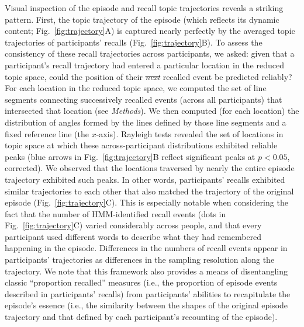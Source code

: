 \documentclass[10pt]{article}
\renewcommand{\includegraphics}[2][]{} %
\newcommand{\arrows}{7} %
\providecommand{\DIFaddtex}[1]{{\protect\color{blue}\uwave{#1}}} %
\providecommand{\DIFdeltex}[1]{{\protect\color{red}\sout{#1}}}                      %
\providecommand{\DIFaddbegin}{} %
\providecommand{\DIFaddend}{} %
\providecommand{\DIFdelbegin}{} %
\providecommand{\DIFdelend}{} %
\providecommand{\DIFadd}[1]{\texorpdfstring{\DIFaddtex{#1}}{#1}} %
\providecommand{\DIFdel}[1]{\texorpdfstring{\DIFdeltex{#1}}{}} %
\newcommand{\DIFscaledelfig}{0.5}
\newlength{\DIFdelgraphicswidth} %
\newlength{\DIFdelgraphicsheight} %
\newcommand{\DIFaddincludegraphics}[2][]{{\color{blue}\fbox{\DIFOincludegraphics[#1]{#2}}}} %
\newcommand{\DIFdelincludegraphics}[2][]{%
\sbox{\DIFdelgraphicsbox}{\DIFOincludegraphics[#1]{#2}}%
\settoboxwidth{\DIFdelgraphicswidth}{\DIFdelgraphicsbox} %
\settoboxtotalheight{\DIFdelgraphicsheight}{\DIFdelgraphicsbox} %
\scalebox{\DIFscaledelfig}{%
\parbox[b]{\DIFdelgraphicswidth}{\usebox{\DIFdelgraphicsbox}\\[-\baselineskip] \rule{\DIFdelgraphicswidth}{0em}}\llap{\resizebox{\DIFdelgraphicswidth}{\DIFdelgraphicsheight}{%
\setlength{\unitlength}{\DIFdelgraphicswidth}%
\begin{picture}(1,1)%
\thicklines\linethickness{2pt} %
{\color[rgb]{1,0,0}\put(0,0){\framebox(1,1){}}}%
{\color[rgb]{1,0,0}\put(0,0){\line( 1,1){1}}}%
{\color[rgb]{1,0,0}\put(0,1){\line(1,-1){1}}}%
\end{picture}%
}\hspace*{3pt}}} %
} %
\DeclareRobustCommand{\DIFaddbegin}{\DIFOaddbegin \let\includegraphics\DIFaddincludegraphics} %
\DeclareRobustCommand{\DIFaddend}{\DIFOaddend \let\includegraphics\DIFOincludegraphics} %
\DeclareRobustCommand{\DIFdelbegin}{\DIFOdelbegin \let\includegraphics\DIFdelincludegraphics} %
\DeclareRobustCommand{\DIFdelend}{\DIFOaddend \let\includegraphics\DIFOincludegraphics} %
\begin{document}
Visual inspection of the episode and recall topic trajectories reveals a striking pattern.  First, the topic trajectory of the episode (which reflects its dynamic content; Fig.~\ref{fig:trajectory}A) is captured nearly perfectly by the averaged topic trajectories of participants' recalls (Fig.~\ref{fig:trajectory}B).  To assess the consistency of these recall trajectories across participants, we asked: given that a participant's recall trajectory had entered a particular location in the reduced topic space, could the position of their \DIFdelbegin \textit{\DIFdel{next}} %
\DIFdelend \DIFaddbegin \DIFadd{next }\DIFaddend recalled event be predicted reliably?  For each location in the reduced topic space, we computed the set of line segments connecting successively recalled events (across all participants) that intersected that location (see \textit{Methods}\DIFaddbegin \DIFadd{, Supp.\ Fig.~\arrows}\DIFaddend ).  We then computed (for each location) the distribution of angles formed by the lines defined by those line segments and a fixed reference line (the $x$-axis).  Rayleigh tests revealed the set of locations in topic space at which these across-participant distributions exhibited reliable peaks (blue arrows in Fig.~\ref{fig:trajectory}B reflect significant peaks at $p < 0.05$, corrected).  We observed that the locations traversed by nearly the entire episode trajectory exhibited such peaks.  In other words, participants' recalls exhibited similar trajectories to each other that also matched the trajectory of the original episode (Fig.~\ref{fig:trajectory}C).  This is especially notable when considering the fact that the number of HMM-identified recall events (dots in Fig.~\ref{fig:trajectory}C) varied considerably across people, and that every participant used different words to describe what they had remembered happening in the episode.  Differences in the numbers of recall events appear in participants' trajectories as differences in the sampling resolution along the trajectory.  We note that this framework also provides a means of disentangling classic ``proportion recalled'' measures (i.e., the proportion of episode events described in participants' recalls) from participants' abilities to recapitulate the episode's essence (i.e., the similarity between the shapes of the original episode trajectory and that defined by each participant's recounting of the episode).
\end{document}
